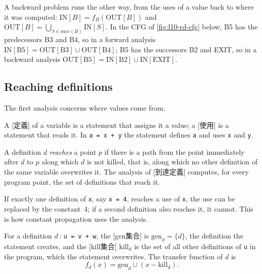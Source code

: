 \documentclass[../main.tex]{subfiles}
\begin{document}
A backward problem runs the other way, from the uses of a value back
to where it was computed: $\mathrm{IN}[B]=f_B(\mathrm{OUT}[B])$ and
$\mathrm{OUT}[B]=\bigcup_{S\in\mathrm{succ}(B)}\mathrm{IN}[S]$.  In
the CFG of \cref{fig:l10-rd-cfg} below, B5 has the predecessors B3 and
B4, so in a forward analysis
$\mathrm{IN}[\mathrm{B5}]=\mathrm{OUT}[\mathrm{B3}]\cup\mathrm{OUT}[\mathrm{B4}]$;
B5 has the successors B2 and EXIT, so in a backward analysis
$\mathrm{OUT}[\mathrm{B5}]=\mathrm{IN}[\mathrm{B2}]\cup\mathrm{IN}[\mathrm{EXIT}]$.

\subsection{Reaching definitions}

The first analysis concerns where values come from.

\begin{definition}
  A [定義] of a variable is a statement that assigns
  it a value; a [使用] is a statement that reads it.  In
  \texttt{a = x + y} the statement defines \texttt{a} and uses
  \texttt{x} and \texttt{y}.
\end{definition}

\begin{definition}
  A definition $d$ \emph{reaches} a point $p$ if there is a path from
  the point immediately after $d$ to $p$ along which $d$ is not killed,
  that is, along which no other definition of the same variable
  overwrites it.  The analysis of [到達定義]
  computes, for every program point, the set of definitions that reach
  it.
\end{definition}

  If exactly one definition of
\texttt{x}, say \texttt{x = 4}, reaches a use of \texttt{x}, the use
can be replaced by the constant~4; if a second definition also reaches
it, it cannot.  This is how constant propagation uses the analysis.

\begin{definition}
  For a definition $d$\,: \texttt{u = v + w}, the
  [gen集合] is $\mathrm{gen}_d=\{d\}$, the definition the
  statement creates, and the [kill集合]
  $\mathrm{kill}_d$ is the set of all other definitions of \texttt{u}
  in the program, which the statement overwrites.  The transfer
  function of $d$ is
  \begin{equation}
    \label{eq:l10-fd}
    f_d(x) = \mathrm{gen}_d \cup (x - \mathrm{kill}_d).
  \end{equation}
\end{definition}
\end{document}
